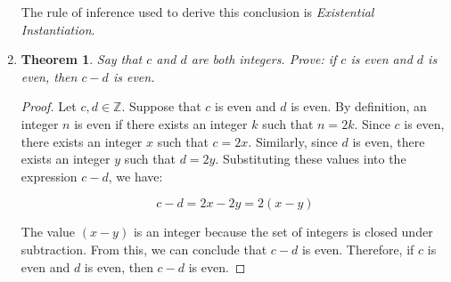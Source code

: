 \documentclass{article}
\newtheorem{theorem}{Theorem}
\begin{document}
\begin{enumerate}
          The rule of inference used to derive this conclusion is \textit{Existential
              Instantiation}.

          \newpage

    \item \begin{theorem}
              Say that $c$ and $d$ are both integers. Prove: if $c$ is even and $d$ is even,
              then $c-d$ is even.
          \end{theorem}

          \begin{proof}
              Let $c, d \in \mathbb{Z}$. Suppose that $c$ is even and $d$ is even. By definition,
              an integer $n$ is even if there exists an integer $k$ such that $n = 2k$. Since $c$ is
              even, there exists an integer $x$ such that $c = 2x$. Similarly, since $d$ is even,
              there exists an integer $y$ such that $d = 2y$. Substituting these values into the
              expression $c - d$, we have:

              \[c - d = 2x - 2y = 2(x - y)\]

              The value $(x - y)$ is an integer because the set of integers is closed under
              subtraction. From this, we can conclude that $c - d$ is even. Therefore, if $c$
              is even and $d$ is even, then $c - d$ is even.
          \end{proof}

\end{enumerate}
\end{document}
